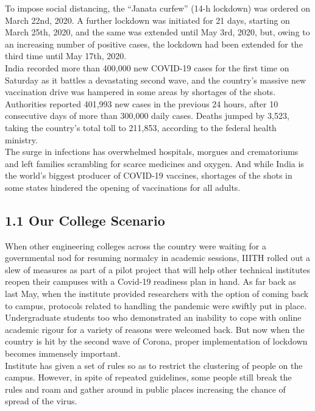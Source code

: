 \documentclass[eng]{FCEFyN-class}
\begin{document}
 To impose social distancing, the “Janata curfew” (14-h lockdown) was ordered on March 22nd, 2020. A further lockdown was initiated for 21 days, starting on March 25th, 2020, and the same was extended until May 3rd, 2020, but, owing to an increasing number of positive cases, the lockdown had been extended for the third time until May 17th, 2020. \\

India recorded more than 400,000 new COVID-19 cases for the first time on Saturday as it battles a devastating second wave, and the country's massive new vaccination drive was hampered in some areas by shortages of the shots.\\
Authorities reported 401,993 new cases in the previous 24 hours, after 10 consecutive days of more than 300,000 daily cases. Deaths jumped by 3,523, taking the country's total toll to 211,853, according to the federal health ministry.\\
The surge in infections has overwhelmed hospitals, morgues and crematoriums and left families scrambling for scarce medicines and oxygen. And while India is the world's biggest producer of COVID-19 vaccines, shortages of the shots in some states hindered the opening of vaccinations for all adults.\

\subsection{1.1 Our College Scenario}
When other engineering colleges across the country were waiting for a governmental nod for resuming normalcy in academic sessions, IIITH rolled out a slew of measures as part of a pilot project that will help other technical institutes reopen their campuses with a Covid-19 readiness plan in hand. As far back as last May, when the institute provided researchers with the option of coming back to campus, protocols related to handling the pandemic were swiftly put in place. Undergraduate students too who demonstrated an inability to cope with online academic rigour for a variety of reasons were welcomed back. But now when the country is hit by the second wave of Corona, proper implementation of lockdown becomes immensely important.\hypersetup{citecolor=red}\cite{IIITH} \\

Institute has given a set of rules so as to restrict the clustering of people on the campus. However, in spite of repeated guidelines, some people still break the rules and roam and gather around in public places increasing the chance of spread of the virus. \\
\end{document}
